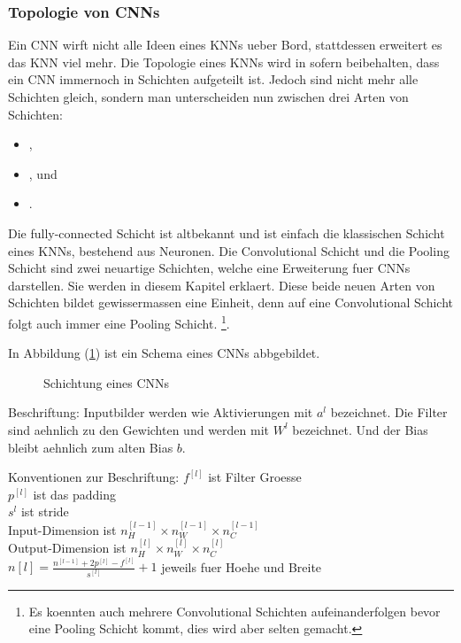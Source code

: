 \documentclass[../main]{subfiles}
\begin{document}
\subsubsection{Topologie von CNNs}
Ein CNN wirft nicht alle Ideen eines KNNs ueber Bord, stattdessen erweitert es
das KNN viel mehr.
Die Topologie eines KNNs wird in sofern beibehalten, dass ein CNN immernoch in
Schichten aufgeteilt ist. Jedoch sind nicht mehr alle Schichten gleich, sondern
man unterscheiden nun zwischen drei Arten von Schichten:
\begin{itemize}
\item{,}
\item{, und}
\item{.}
\end{itemize}
Die fully-connected Schicht ist altbekannt und ist einfach die klassischen Schicht
eines KNNs, bestehend aus Neuronen.
Die Convolutional Schicht und die Pooling Schicht sind zwei neuartige Schichten,
welche eine Erweiterung fuer CNNs darstellen. Sie werden in diesem Kapitel erklaert.
Diese beide neuen Arten von Schichten bildet gewissermassen eine Einheit, denn
auf eine Convolutional Schicht folgt auch immer eine Pooling Schicht.
\footnote{
  Es koennten auch mehrere Convolutional Schichten aufeinanderfolgen bevor eine
  Pooling Schicht kommt, dies wird aber selten gemacht.
}.

\para{}
In Abbildung (\ref{fig:cnn_topology}) ist ein Schema eines CNNs abbgebildet.
\begin{figure}[h!]

  \caption{Schichtung eines CNNs}
  \label{fig:cnn_topology}
\end{figure}

Beschriftung:
Inputbilder werden wie Aktivierungen mit $a^l$ bezeichnet.
Die Filter sind aehnlich zu den Gewichten und werden mit $W^l$ bezeichnet.
Und der Bias bleibt aehnlich zum alten Bias $b$.

Konventionen zur Beschriftung:
$f^{[l]}$ ist Filter Groesse\\
$p^{[l]}$ ist das padding\\
$s^{l}$ ist stride\\
Input-Dimension ist $n_H^{[l-1]} \times n_W^{[l-1]} \times n_C^{[l-1]}$\\
Output-Dimension ist $n_H^{[l]} \times n_W^{[l]} \times n_C^{[l]}$\\

$n[l] = \frac{n^{[l-1]} + 2p^{[l]} - f^{[l]}}{s^{[l]}} + 1$ jeweils fuer Hoehe
und Breite\\
\end{document}
